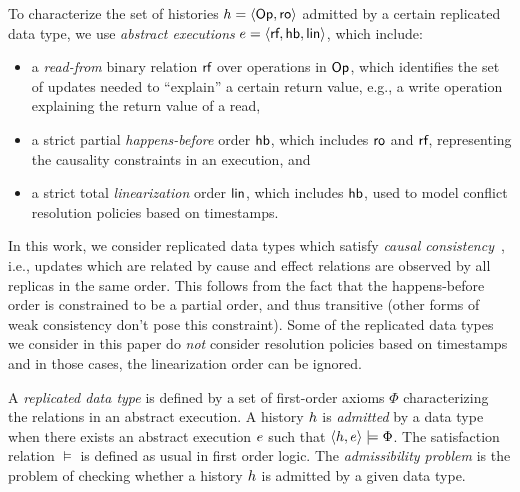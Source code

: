 To characterize the set of histories ${h}={\left\langle{\mathsf{Op}, \mathsf{ro}}\right\rangle}$ admitted by a certain replicated data type, we use \emph{abstract executions} ${e} = {\left\langle{ \textsf{rf} ,\textsf{hb},\mathsf{lin}}\right\rangle}$, which include:
\vspace{-2.5mm}
\begin{itemize}
  \item a \emph{read-from} binary relation $\textsf{rf}$ over operations in $\mathsf{Op}$, which identifies the set of updates needed to ``explain'' a certain return value, e.g., a {\sf write} operation explaining the return value of a {\sf read},
  \item a strict partial \emph{happens-before} order $\textsf{hb}$, which includes $\mathsf{ro}$ and $\textsf{rf}$, representing the causality constraints in an execution, and
  \item a strict total \emph{linearization} order $\mathsf{lin}$, which includes $\textsf{hb}$, used to model conflict resolution policies based on timestamps.
\end{itemize}
\vspace{-1mm}
In this work, we consider replicated data types which satisfy \emph{causal consistency}~\cite{DBLP:journals/cacm/Lamport78}, i.e., updates which are related by cause and effect relations are observed by all replicas in the same order. This follows from the fact that the happens-before order is constrained to be a partial order, and thus transitive (other forms of weak consistency don't pose this constraint). Some of the replicated data types we consider in this paper do \emph{not} consider resolution policies based on timestamps and in those cases, the linearization order can be ignored.

A \emph{replicated data type} is defined by a set of first-order axioms $\Phi$ characterizing the relations in an abstract execution. 
A history ${h}$ is \emph{admitted} by a data type when there exists an abstract execution ${e}$ such that ${\left\langle{{h},{e}}\right\rangle}\models\Phi$. The satisfaction relation $\models$ is defined as usual in first order logic. The \emph{admissibility problem} is the problem of checking whether a history ${h}$ is admitted by a given data type.

